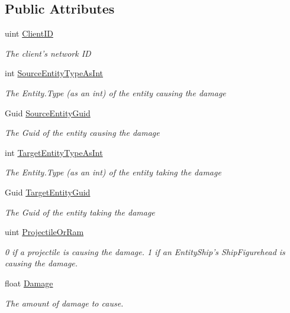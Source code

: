 \subsection*{Public Attributes}
\begin{DoxyCompactItemize}
\item 
uint \hyperlink{class_skyrates_1_1_client_1_1_network_1_1_event_1_1_event_request_entity_ship_damaged_ad94336950fda83114dea2b970c45291b}{Client\-I\-D}
\begin{DoxyCompactList}\small\item\em The client's network I\-D \end{DoxyCompactList}\item 
int \hyperlink{class_skyrates_1_1_client_1_1_network_1_1_event_1_1_event_request_entity_ship_damaged_a91ee85563df3e63d2785eee094198426}{Source\-Entity\-Type\-As\-Int}
\begin{DoxyCompactList}\small\item\em The Entity.\-Type (as an int) of the entity causing the damage \end{DoxyCompactList}\item 
Guid \hyperlink{class_skyrates_1_1_client_1_1_network_1_1_event_1_1_event_request_entity_ship_damaged_ad8fde95b6ab97884c4f9c1bd8e0c5e88}{Source\-Entity\-Guid}
\begin{DoxyCompactList}\small\item\em The Guid of the entity causing the damage \end{DoxyCompactList}\item 
int \hyperlink{class_skyrates_1_1_client_1_1_network_1_1_event_1_1_event_request_entity_ship_damaged_afd3e6c2b92a3392e6ef63de092a45578}{Target\-Entity\-Type\-As\-Int}
\begin{DoxyCompactList}\small\item\em The Entity.\-Type (as an int) of the entity taking the damage \end{DoxyCompactList}\item 
Guid \hyperlink{class_skyrates_1_1_client_1_1_network_1_1_event_1_1_event_request_entity_ship_damaged_a19c23f9e1ef2288a565235a8ad0dd053}{Target\-Entity\-Guid}
\begin{DoxyCompactList}\small\item\em The Guid of the entity taking the damage \end{DoxyCompactList}\item 
uint \hyperlink{class_skyrates_1_1_client_1_1_network_1_1_event_1_1_event_request_entity_ship_damaged_a7698a587eca1bd6f969c5a03da012d5e}{Projectile\-Or\-Ram}
\begin{DoxyCompactList}\small\item\em 0 if a projectile is causing the damage. 1 if an Entity\-Ship's Ship\-Figurehead is causing the damage. \end{DoxyCompactList}\item 
float \hyperlink{class_skyrates_1_1_client_1_1_network_1_1_event_1_1_event_request_entity_ship_damaged_ab3f8cd68107133271b5d5280c351060e}{Damage}
\begin{DoxyCompactList}\small\item\em The amount of damage to cause. \end{DoxyCompactList}\end{DoxyCompactItemize}
